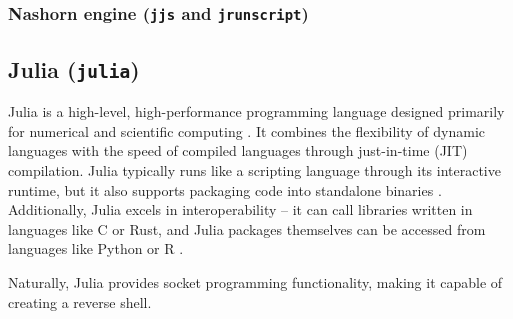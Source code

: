 


\subsubsection{Nashorn engine (\texttt{jjs} and \texttt{jrunscript})}







\subsection{Julia (\texttt{julia})}


Julia is a high-level, high-performance programming language designed primarily for numerical and scientific computing \cite{julia-intro}. It combines the flexibility of dynamic languages with the speed of compiled languages through just-in-time (JIT) compilation. Julia typically runs like a scripting language through its interactive runtime, but it also supports packaging code into standalone binaries \cite{julia-compiler}. Additionally, Julia excels in interoperability -- it can call libraries written in languages like C or Rust, and Julia packages themselves can be accessed from languages like Python or R \cite{julia-calling-c}.

Naturally, Julia provides socket programming functionality, making it capable of creating a reverse shell.



